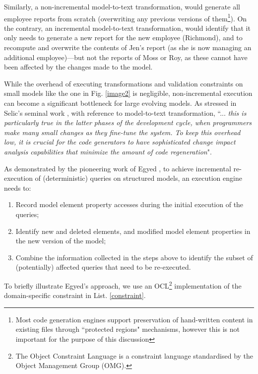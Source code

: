 \documentclass{llncs}
\begin{document}
Similarly, a non-incremental model-to-text transformation, would generate all employee reports from scratch (overwriting any previous versions of them\footnote{Most code generation engines support preservation of hand-written content in existing ﬁles through ``protected regions" mechanisms, however this is not important for the purpose of this discussion}). On the contrary, an incremental model-to-text transformation, would identify that it only needs to generate a new report for the new employee (Richmond), and to recompute and overwrite the contents of Jen's report (as she is now managing an additional employee)---but not the reports of Moss or Roy, as these cannot have been affected by the changes made to the model.

While the overhead of executing transformations and validation constraints on small models like the one in Fig. \ref{image2} is negligible, non-incremental execution can become a significant bottleneck for large evolving models. As stressed in Selic’s seminal work \cite{selic2003pragmatics}, with reference to model-to-text transformation, ``... \emph{this is particularly true in the latter phases of the development cycle, when programmers make many small changes as they fine-tune the system. To keep this overhead low, it is crucial for the code generators to have sophisticated change impact analysis capabilities that minimize the amount of code regeneration}".

As demonstrated by the pioneering work of Egyed \cite{egyed2011automatically}, to achieve incremental re-execution of (deterministic) queries on structured models, an execution engine needs to:

\begin{enumerate}
\item Record model element property accesses during the initial execution of the queries;
\item Identify new and deleted elements, and modified model element properties in the new version
of the model;
\item Combine the information collected in the steps above to identify the subset of (potentially) affected queries that need to be re-executed.
\end{enumerate}

To brieﬂy illustrate Egyed’s approach, we use an OCL\footnote{The Object Constraint Language is a constraint language standardised by the Object Management Group (OMG).} implementation of the domain-specific constraint in List. \ref{constraint}.
\end{document}
